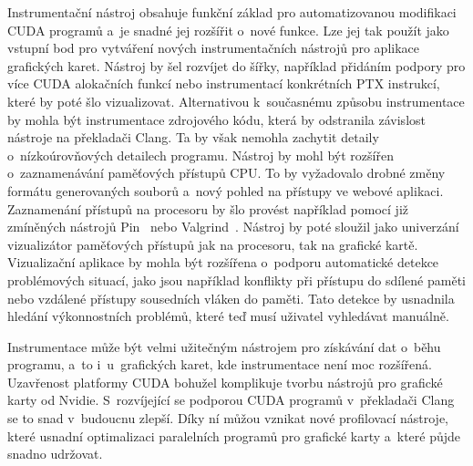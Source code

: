 Instrumentační nástroj obsahuje funkční základ pro automatizovanou modifikaci CUDA programů a~je snadné jej rozšířit o~nové funkce. Lze jej tak použít jako vstupní bod pro vytváření nových instrumentačních nástrojů pro aplikace grafických karet. Nástroj by šel rozvíjet do šířky, například přidáním podpory pro více CUDA alokačních funkcí nebo instrumentací konkrétních PTX instrukcí, které by poté šlo vizualizovat. Alternativou k~současnému způsobu instrumentace by mohla být instrumentace zdrojového kódu, která by odstranila závislost nástroje na překladači Clang. Ta by však nemohla zachytit detaily o~nízkoúrovňových detailech programu.
Nástroj by mohl být rozšířen o~zaznamenávání paměťových přístupů CPU. To by vyžadovalo drobné změny formátu generovaných souborů a~nový pohled na přístupy ve webové aplikaci. Zaznamenání přístupů na procesoru by šlo provést například pomocí již zmíněných nástrojů Pin~\cite{pin} nebo Valgrind~\cite{valgrind}. Nástroj by poté sloužil jako univerzání vizualizátor paměťových přístupů jak na procesoru, tak na grafické kartě. Vizualizační aplikace by mohla být rozšířena o~podporu automatické detekce problémových situací, jako jsou například konflikty při přístupu do sdílené paměti nebo vzdálené přístupy sousedních vláken do paměti. Tato detekce by usnadnila hledání výkonnostních problémů, které teď musí uživatel vyhledávat manuálně.

Instrumentace může být velmi užitečným nástrojem pro získávání dat o~běhu programu, a~to i~u~grafických karet, kde instrumentace není moc rozšířená. Uzavřenost platformy CUDA bohužel komplikuje tvorbu nástrojů pro grafické karty od Nvidie. S~rozvíjející se podporou CUDA programů v~překladači Clang se to snad v~budoucnu zlepší. Díky ní můžou vznikat nové profilovací nástroje, které usnadní optimalizaci paralelních programů pro grafické karty a~které půjde snadno udržovat.
